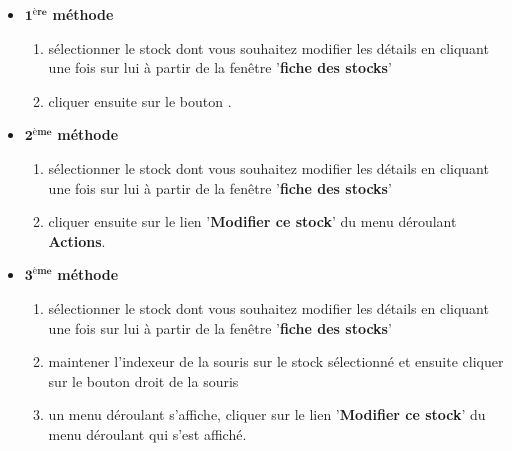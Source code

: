 \begin{itemize}[]
	\item \textcolor{purplish}{$\mathbf{1^{\text{\`ere}}}$ \textbf{m\'ethode}}
	\begin{enumerate}[1)]
		\item s\'electionner le stock dont vous souhaitez
		modifier les d\'etails en cliquant une fois sur lui
		\` a partir de la fen\^etre '\textbf{fiche des stocks}'
		
		\item cliquer ensuite sur le bouton .	\\
	\end{enumerate}
	
	\item \textcolor{purplish}{$\mathbf{2^{\text{\`eme}}}$ \textbf{m\'ethode}}
	\begin{enumerate}[1)]
		\item s\'electionner le stock dont vous souhaitez
		modifier les d\'etails en cliquant une fois sur lui
		\` a partir de la fen\^etre '\textbf{fiche des stocks}'
		
		\item cliquer ensuite sur le lien '\textbf{Modifier ce stock}'
		du menu d\'eroulant \textbf{Actions}.\\
	\end{enumerate}
	
	\item \textcolor{purplish}{$\mathbf{3^{\text{\`eme}}}$ \textbf{m\'ethode}}
	\begin{enumerate}[1)]
		\item s\'electionner le stock dont vous souhaitez
		modifier les d\'etails en cliquant une fois sur lui
		\` a partir de la fen\^etre '\textbf{fiche des stocks}'
		
		\item maintener l'indexeur de la souris sur le stock
		s\'electionn\'e et ensuite cliquer sur le bouton
		droit de la souris
		
		\item un menu d\'eroulant s'affiche, cliquer sur
		le lien '\textbf{Modifier ce stock}' du	menu
		d\'eroulant qui s'est affich\'e.\\
	\end{enumerate}
\end{itemize}


\newpage
{}


